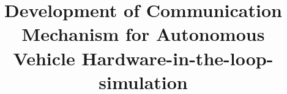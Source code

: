 \documentclass[conference]{config/paper/IEEEtran}
\begin{document}
\title{Development of Communication Mechanism for Autonomous Vehicle
	Hardware-in-the-loop-simulation}



\maketitle











% 

\printbibliography

\end{document}

